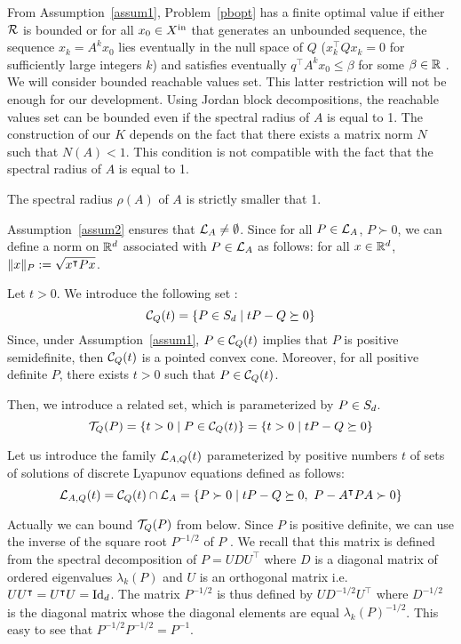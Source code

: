\documentclass[10pt]{article}
\begin{document}
From Assumption~\ref{assum1}, Problem~\eqref{pbopt} has a finite optimal value if either $\mathcal{R}$ is bounded or for all 
$x_0\in X^\mathrm{in}$ that generates an unbounded sequence, the sequence $x_k=A^k x_0$ lies eventually in the null space of $Q$ ($x_k^\intercal Q x_k=0$ for sufficiently large integers $k$) and satisfies eventually $q^\intercal A^k x_0\leq \beta$ for some $\beta\in\mathbb R$ .  We will consider bounded reachable values set. This latter restriction will not be enough for our development. Using Jordan block decompositions, the reachable values set can be bounded even if the spectral radius of $A$ is equal to 1. The construction of our $K$ depends on the fact that there exists a matrix norm $N$ such that $N(A)<1$. This condition is not compatible with the fact that the spectral radius of $A$ is equal to 1.

\begin{assumption}
\label{assum2}
The spectral radius $\rho(A)$ of $A$ is strictly smaller that 1.
\end{assumption}

Assumption~\ref{assum2} ensures that $\mathcal{L}_{A}\neq \emptyset$. Since for all $P\in\mathcal{L}_{A}$, $P\succ 0$, we can define a norm on $\mathbb R^d$ associated with $P\in\mathcal{L}_{A}$ as follows: for all $x\in\mathbb R^d$, $\| x\|_P:=\sqrt{x^\intercal P x}$. 

Let $t>0$. We introduce the following set :  
\[
\mathcal{C}_{Q}(t)=\{P\in S_d\mid tP-Q\succeq 0\}
\]
Since, under Assumption~\ref{assum1}, $P\in\mathcal{C}_{Q}(t)$ implies that $P$ is positive semidefinite, then $\mathcal{C}_{Q}(t)$ is a pointed convex cone. Moreover, for all positive definite $P$, there exists $t>0$ such that $P\in \mathcal{C}_{Q}(t)$. 

Then, we introduce a related set, which is parameterized by $P\in S_d$.
\[
\mathcal{T}_{Q}(P)=\{t>0\mid P\in\mathcal{C}_{Q}(t) \}=\{t>0\mid tP-Q\succeq 0\}
\]

Let us introduce the family $\mathcal{L}_{A,Q}(t)$ parameterized by positive numbers $t$ of sets of solutions of discrete Lyapunov equations defined as follows:
\[
\mathcal{L}_{A,Q}(t)=\mathcal{C}_{Q}(t)\cap\mathcal{L}_{A}=\{P\succ 0\mid tP-Q\succeq 0,\ P-A^\intercal P A\succ 0\}
\]
\begin{comment}
Finally, we need a third related set . For all $P\succ 0$, we define:

\[
\lyaa{P}=\{t>0\mid P\in\lyat{A,Q}\} 
\]
\end{comment}
Actually we can bound $\mathcal{T}_{Q}(P)$ from below. Since $P$ is positive definite, we can use the inverse of the square root $P^{-1/2}$ of $P$ . We recall that this matrix is defined from the spectral decomposition of $P=U D U^\intercal$ where $D$ is a diagonal  matrix of ordered eigenvalues $\lambda_k(P)$ and $U$ is an orthogonal matrix i.e. $U U^\intercal = U^\intercal U=\operatorname{Id}_d$.   The matrix  $P^{-1/2}$ is thus defined by 
$UD^{-1/2} U^\intercal$ where $D^{-1/2}$ is the diagonal matrix whose the diagonal elements are equal $\lambda_k(P)^{-1/2}$. This easy to see that $P^{-1/2} P^{-1/2}=P^{-1}$. 
\end{document}
